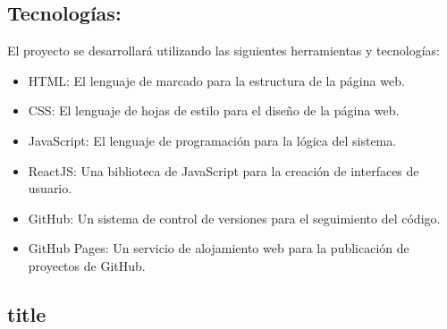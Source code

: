 \documentclass[12pt]{article}
\begin{document}
        \subsection{Tecnologías: }
        El proyecto se desarrollará utilizando las siguientes herramientas y tecnologías:
        \begin{itemize}
            \item HTML: El lenguaje de marcado para la estructura de la página web.
            \item CSS: El lenguaje de hojas de estilo para el diseño de la página web.
            \item JavaScript: El lenguaje de programación para la lógica del sistema.
            \item ReactJS: Una biblioteca de JavaScript para la creación de interfaces de usuario.
            \item GitHub: Un sistema de control de versiones para el seguimiento del código.
            \item GitHub Pages: Un servicio de alojamiento web para la publicación de proyectos de GitHub.
        \end{itemize}
        \subsection{title}
\end{document}
